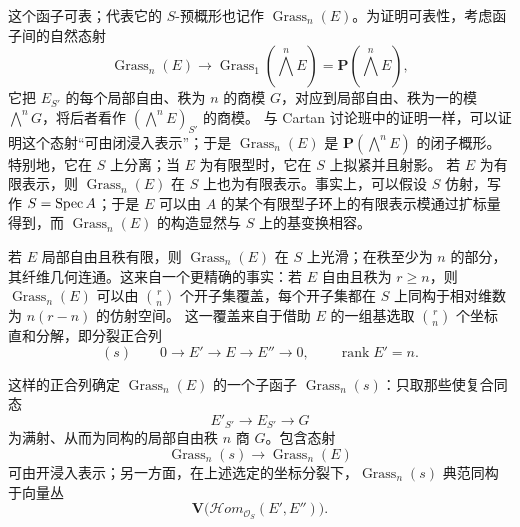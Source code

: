 这个函子可表；代表它的 $S$-预概形也记作 $\operatorname{Grass}_n(E)$。为证明可表性，考虑函子间的自然态射
\[
\operatorname{Grass}_n(E)\longrightarrow
\operatorname{Grass}_1(\textstyle\bigwedge^nE)
=\mathbf P(\textstyle\bigwedge^nE),
\]
它把 $E_{S'}$ 的每个局部自由、秩为 $n$ 的商模 $G$，对应到局部自由、秩为一的模 $\bigwedge^nG$，将后者看作 $(\bigwedge^nE)_{S'}$ 的商模。
与 Cartan 讨论班中的证明一样，可以证明这个态射“可由闭浸入表示”；于是 $\operatorname{Grass}_n(E)$ 是 $\mathbf P(\bigwedge^nE)$ 的闭子概形。特别地，它在 $S$ 上分离；当 $E$ 为有限型时，它在 $S$ 上拟紧并且射影。
若 $E$ 为有限表示，则 $\operatorname{Grass}_n(E)$ 在 $S$ 上也为有限表示。事实上，可以假设 $S$ 仿射，写作 $S=\operatorname{Spec} A$；于是 $E$ 可以由 $A$ 的某个有限型子环上的有限表示模通过扩标量得到，而 $\operatorname{Grass}_n(E)$ 的构造显然与 $S$ 上的基变换相容。

若 $E$ 局部自由且秩有限，则 $\operatorname{Grass}_n(E)$ 在 $S$ 上光滑；在秩至少为 $n$ 的部分，其纤维几何连通。这来自一个更精确的事实：若 $E$ 自由且秩为 $r\geq n$，则 $\operatorname{Grass}_n(E)$ 可以由 $\binom rn$ 个开子集覆盖，每个开子集都在 $S$ 上同构于相对维数为 $n(r-n)$ 的仿射空间。
这一覆盖来自于借助 $E$ 的一组基选取 $\binom rn$ 个坐标直和分解，即分裂正合列
\[
(s)\qquad0\longrightarrow E'\longrightarrow E
\longrightarrow E''\longrightarrow0,
\qquad\operatorname{rank}E'=n.
\]

这样的正合列确定 $\operatorname{Grass}_n(E)$ 的一个子函子 $\operatorname{Grass}_n(s)$：只取那些使复合同态
\[
E'_{S'}\longrightarrow E_{S'}\longrightarrow G
\]
为满射、从而为同构的局部自由秩 $n$ 商 $G$。包含态射
\[
\operatorname{Grass}_n(s)\longrightarrow\operatorname{Grass}_n(E)
\]
可由开浸入表示；另一方面，在上述选定的坐标分裂下，$\operatorname{Grass}_n(s)$ 典范同构于向量丛
\[
\mathbf V\bigl(\mathscr{H}\!om_{\mathcal O_S}(E',E'')\bigr).
\]


